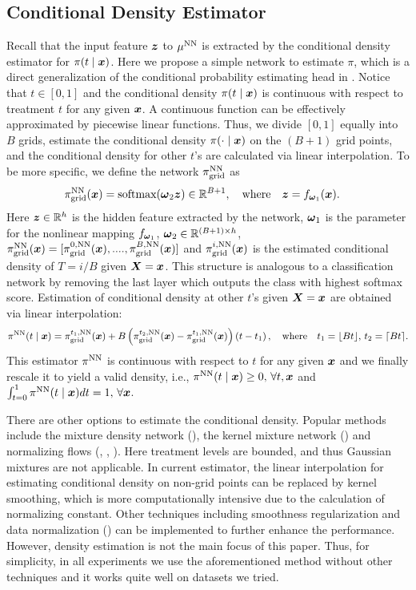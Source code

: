 \subsection{Conditional Density Estimator} 
Recall that the input feature $\boldsymbol{z}$ to $\mu^{\text{NN}}$ is extracted by the conditional density estimator for $\pi(t\mid\boldsymbol{x})$. Here we propose a simple network to estimate $\pi$, which is a direct generalization of the conditional probability estimating head in \cite{shi2019adapting}. 
Notice that $t\in[0,1]$ and the conditional density $\pi(t\mid\boldsymbol{x})$ is continuous with respect to treatment $t$ for any given $\boldsymbol{x}$. A continuous function can be effectively approximated by piecewise linear functions. Thus, we divide $[0,1]$ equally into $B$ grids, estimate the conditional density $\pi(\cdot\mid\boldsymbol{x})$ on the $(B+1)$ grid points, and the conditional density for other $t$'s are calculated via linear interpolation. To be more specific, we define the network $\pi^{\text{NN}}_{\text{grid}}$ as
\begin{align*}
\pi^{\text{NN}}_{\text{grid}}(\boldsymbol{x}) & =\text{softmax}(\boldsymbol{\omega}_{2}\boldsymbol{z})\in\mathbb{R}^{B+1},
\quad
\text{where}
\quad
\boldsymbol{z}  =f_{\boldsymbol{\omega}_{1}}(\boldsymbol{x}).
\end{align*}
Here $\boldsymbol{z}\in\mathbb{R}^{h}$ is the hidden feature extracted by the
network, $\boldsymbol{\omega}_{1}$ is the parameter for the nonlinear mapping $f_{\boldsymbol{\omega}_{1}}$,
$\boldsymbol{\omega}_{2}\in\mathbb{R}^{(B+1)\times h}$, $\pi_{\text{grid}}^{\text{NN}}(\boldsymbol{x})=[\pi_{\text{grid}}^{0,\text{NN}}(\boldsymbol{x}),....,\pi_{\text{grid}}^{B,\text{NN}}(\boldsymbol{x})]$ and  $\pi_{\text{grid}}^{i,\text{NN}}(\boldsymbol{x})$ is the estimated conditional density of $T=i/B$ given $\boldsymbol{X}=\boldsymbol{x}$. This structure is analogous to a classification network by removing the last layer which outputs the class with highest softmax score.
Estimation of conditional density at other $t$'s given $\boldsymbol{X}=\boldsymbol{x}$ are obtained via linear interpolation:
\[
\pi^{\text{NN}}(t\mid\boldsymbol{x})=\pi_{\text{grid}}^{t_{1},\text{NN}}(\boldsymbol{x})+B\left(\pi_{\text{grid}}^{t_{2},\text{NN}}(\boldsymbol{x})-\pi_{\text{grid}}^{t_{1},\text{NN}}(\boldsymbol{x})\right)\left(t-t_{1}\right),\quad\text{where}\quad t_1=\lfloor Bt\rfloor,\,t_2=\lceil Bt\rceil.
\]
This estimator $\pi^{\text{NN}}$ is continuous with respect to $t$ for any given $\boldsymbol{x}$ and we finally rescale it to yield a valid  density, i.e., $\pi^{\text{NN}}(t\mid\boldsymbol{x})\geq 0,\,\forall t,\boldsymbol{x}$ and $\int_{t=0}^{1}\pi^{\text{NN}}(t\mid\boldsymbol{x})dt=1,\,\forall\boldsymbol{x}$. 

There are other options to estimate the conditional density. Popular methods include the mixture density network  (\cite{bishop1994mixture}), the kernel mixture network (\cite{ambrogioni2017kernel}) and normalizing flows (\cite{rezende2015variational}, \cite{dinh2016density}, \cite{trippe2018conditional}). Here treatment levels are bounded, and thus Gaussian mixtures are not applicable. In current estimator, the linear interpolation for estimating conditional density on non-grid points can be replaced by kernel smoothing, which is more computationally intensive due to the calculation of normalizing constant. Other techniques including smoothness regularization and data normalization (\cite{rothfuss2019conditional}) can be implemented to further enhance the performance. However, density estimation is not the main focus of this paper. Thus, for simplicity, in all experiments we use the aforementioned method without other techniques and it works quite well on datasets we tried.

